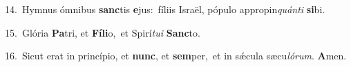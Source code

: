 {\numbfont\textcolor{\numbcolor}{14.}}~Hymnus ómnibus \textbf{sanc}\-tis \textbf{e}\-jus:~\star fíliis Israël, pópulo appropin\-\textit{quán}\-\textit{ti} \textbf{si}\-bi.\par
{\numbfont\textcolor{\numbcolor}{15.}}~Glória \textbf{Pa}\-tri, et \textbf{Fí}\-\textbf{li}o,~\star et Spirí\-\textit{tu}\-\textit{i} \textbf{Sanc}\-to.\par
{\numbfont\textcolor{\numbcolor}{16.}}~Sicut erat in princípio, et \textbf{nunc}\-, et \textbf{sem}\-per,~\star et in sǽcula sæcu\-\textit{ló}\-\textit{rum}. \textbf{A}\-men.\par
